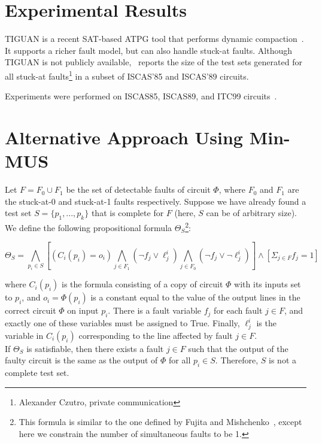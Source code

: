 \documentclass{article}
\begin{document}
\section{Experimental Results}
TIGUAN is a recent SAT-based ATPG tool that performs dynamic compaction~\cite{10.1109/VLSID.2014.17}. It supports a richer fault model, but can also handle stuck-at faults. Although TIGUAN is not publicly available,~\cite{10.1109/VLSID.2014.17} reports the size of the test sets generated for all stuck-at faults\footnote{Alexander Czutro, private communication} in a subset of ISCAS'85 and ISCAS'89 circuits.

Experiments were performed on ISCAS85, ISCAS89, and ITC99 circuits~\cite{iscasTGPRO}.

\section{Alternative Approach Using Min-MUS}
Let $F = F_0 \cup F_1$ be the set of detectable faults of circuit $\Phi$, where $F_0$ and $F_1$ are the stuck-at-0 and stuck-at-1 faults respectively. Suppose we have already found a test set $S = \{p_1,...,p_k \}$ that is complete for $F$ (here, $S$ can be of arbitrary size). We define the following propositional formula $\Theta_S$\footnote{This formula is similar to the one defined by Fujita and Mishchenko~\cite{fujita14}, except here we constrain the number of simultaneous faults to be 1.}:

\begin{displaymath}
\Theta_S = \bigwedge_{p_i \in S}\left[(C_i(p_i)=o_i) \bigwedge_{j\in F_1}(\neg f_j \vee \ell^i_j) \bigwedge_{j \in F_0}(\neg f_j \vee \neg \ell^i_j) \right] \wedge \left[ \Sigma_{j \in F}f_j = 1 \right]
\end{displaymath} 

where $C_i(p_i)$ is the formula consisting of a copy of circuit $\Phi$ with its inputs set to $p_i$, and $o_i = \Phi(p_i)$ is a constant equal to the value of the output lines in the correct circuit $\Phi$ on input $p_i$. There is a fault variable $f_j$ for each fault $j\in F$, and exactly one of these variables must be assigned to True. Finally, $\ell^i_j$ is the variable in $C_i(p_i)$ corresponding to the line affected by fault $j\in F$.\\


If $\Theta_S$ is satisfiable, then there exists a fault $j \in F$ such that the output of the faulty circuit is the same as the output of $\Phi$ for all $p_i \in S$. Therefore, $S$ is not a complete test set.
\end{document}
